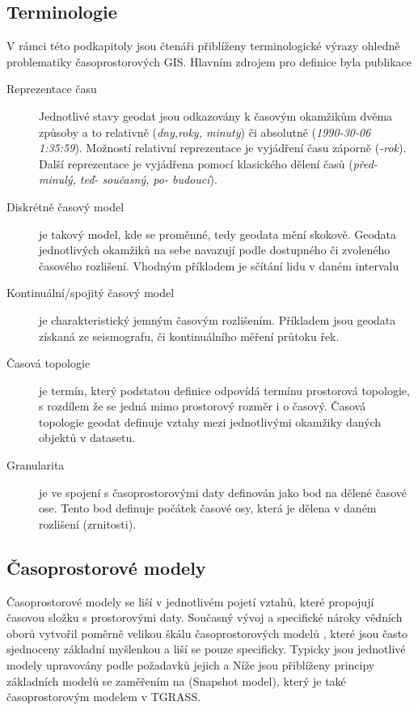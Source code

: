 \documentclass[a4paper,12pt]{report}
\begin{document}
\subsection{Terminologie}
V rámci této podkapitoly jsou čtenáři přiblíženy terminologické výrazy ohledně problematiky časoprostorových GIS. Hlavním zdrojem pro definice byla publikace \cite{pelekis}
\begin{description}
\item[Reprezentace času] Jednotlivé stavy geodat jsou odkazovány k  časovým okamžikům dvěma způsoby a to relativně  (\textit{dny,roky, minuty})  či absolutně (\textit{1990-30-06 1:35:59}). Možností relativní reprezentace je vyjádření času záporně (\textit{-rok}). Další reprezentace je vyjádřena pomocí klasického dělení časů (\textit {před- minulý, teď- současný, po- budoucí}).
\item[Diskrétně časový model] je takový model, kde se proměnné, tedy geodata  mění skokově. Geodata jednotlivých okamžiků na sebe navazují podle dostupného či zvoleného časového rozlišení. Vhodným příkladem je sčítání lidu v daném intervalu
\item[Kontinuální/spojitý časový model] je charakteristický jemným časovým rozlišením. Příkladem jsou geodata získaná ze seismografu, či kontinuálního měření průtoku řek.
\item[Časová topologie] je termín, který podstatou definice odpovídá  termínu prostorová topologie, s rozdílem že se jedná mimo prostorový rozměr i o časový. Časová topologie geodat definuje vztahy mezi jednotlivými okamžiky daných objektů v datasetu.
\item[Granularita] je ve spojení s časoprostorovými daty definován jako bod na dělené časové ose. Tento bod definuje počátek časové osy, která je dělena v daném rozlišení (zrnitosti). 
\end{description}

\subsection{Časoprostorové modely}

Časoprostorové modely se liší v jednotlivém pojetí vztahů, které propojují časovou složku s prostorovými daty. Současný vývoj a specifické nároky vědních oborů vytvořil poměrně velikou škálu časoprostorových modelů \cite{pelekis}, které jsou často sjednoceny  základní myšlenkou a liší se pouze specificky. Typicky jsou jednotlivé modely upravovány podle požadavků jejich  a  Níže jsou přiblíženy principy základních modelů se zaměřením na (Snapshot model), který je také časoprostorovým modelem  v TGRASS.
\end{document}
